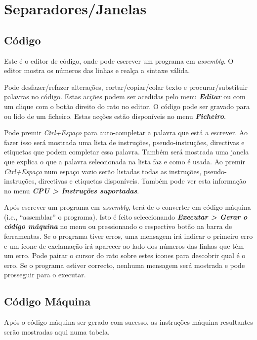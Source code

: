 \documentclass[11pt,a4paper,twoside,titlepage]{article}
\newcommand{\menupath}[1]{\textbf{\emph{#1}}}
\begin{document}
\section{Separadores/Janelas}

\subsection{Código}

Este é o editor de código, onde pode escrever um programa em \emph{assembly}.
O editor mostra os números das linhas e realça a sintaxe válida.

Pode desfazer/refazer alterações, cortar/copiar/colar texto e 
procurar/substituir palavras no código. Estas acções podem ser acedidas pelo
menu \menupath{Editar} ou com um clique com o botão direito do rato no editor.
O código pode ser gravado para ou lido de um ficheiro. Estas acções estão
disponíveis no menu \menupath{Ficheiro}.

Pode premir \emph{Ctrl+Espaço} para auto-completar a palavra que está a escrever.
Ao fazer isso será mostrada uma lista de instruções, pseudo-instruções,
directivas e etiquetas que podem completar essa palavra.
Também será mostrada uma janela que explica o que a palavra seleccionada na lista
faz e como é usada.
Ao premir \emph{Ctrl+Espaço} num espaço vazio serão listadas todas as instruções,
pseudo-instruções, directivas e etiquetas disponíveis.
Também pode ver esta informação no menu \menupath{CPU > Instruções suportadas}.

Após escrever um programa em \emph{assembly}, terá de o converter em código máquina
(i.e., ``assemblar'' o programa).
Isto é feito seleccionando \menupath{Executar > Gerar o código máquina} no menu ou
pressionando o respectivo botão na barra de ferramentas.
Se o programa tiver erros, uma mensagem irá indicar o primeiro erro e um ícone de
exclamação irá aparecer ao lado dos números das linhas que têm um erro.
Pode pairar o cursor do rato sobre estes ícones para descobrir qual é o erro.
Se o programa estiver correcto, nenhuma mensagem será mostrada e pode prosseguir
para o executar.


\subsection{Código Máquina} \label{sec:assembled}

Após o código máquina ser gerado com sucesso, as instruções máquina
resultantes serão mostradas aqui numa tabela.
\end{document}
